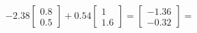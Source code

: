 \documentclass[preview]{standalone}
\begin{document}
\begin{align*}
-2.38 \begin{bmatrix} 0.8 \\ 0.5 \end{bmatrix} + 0.54 \begin{bmatrix} 1 \\ 1.6 \end{bmatrix} = \begin{bmatrix} -1.36 \\ -0.32 \end{bmatrix} =
\end{align*}
\end{document}
